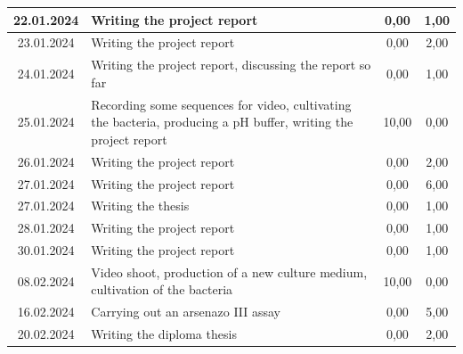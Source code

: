 \begin{longtable}{|c|p{7cm}|c|c|}
    22.01.2024    & Writing the project report                                                                                      & 0,00                 & 1,00              \\ \hline
    23.01.2024    & Writing the project report                                                                                      & 0,00                 & 2,00              \\ \hline
    24.01.2024    & Writing the project report, discussing the report so far                                                        & 0,00                 & 1,00              \\ \hline
    25.01.2024    & Recording some sequences for video, cultivating the bacteria, producing a pH buffer, writing the project report & 10,00 & 0,00 \\ \hline
    26.01.2024    & Writing the project report                                                                                      & 0,00                 & 2,00              \\ \hline
    27.01.2024    & Writing the project report                                                                                      & 0,00                 & 6,00              \\ \hline
    27.01.2024    & Writing the thesis                                                                                              & 0,00                 & 1,00              \\ \hline
    28.01.2024    & Writing the project report                                                                                      & 0,00                 & 1,00              \\ \hline
    30.01.2024    & Writing the project report                                                                                      & 0,00                 & 1,00              \\ \hline
    08.02.2024    & Video shoot, production of a new culture medium, cultivation of the bacteria & 10,00 & 0,00 \\ \hline
    16.02.2024    & Carrying out an arsenazo III assay                                                                              & 0,00                 & 5,00              \\ \hline
    20.02.2024    & Writing the diploma thesis                                                                                      & 0,00                 & 2,00              \\ \hline

\end{longtable}
